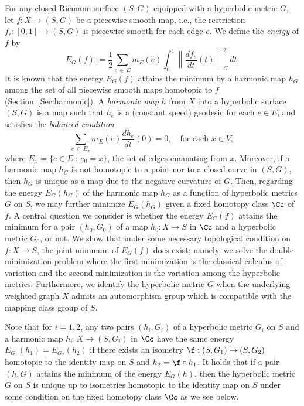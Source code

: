 For any closed Riemann surface $(S, G)$ equipped with a hyperbolic metric $G$, let $f:X \to (S, G)$ be a piecewise smooth map, i.e., the restriction $f_e:[0, 1] \to (S, G)$ is piecewise smooth for each edge $e$. We define the \emph{energy} of $f$ by
\begin{equation}\label{Eq:Dirichlet}
E_G(f):=\frac{1}{2}\sum_{e\,\in\,E}m_E(e)\int_0^1\left\|\frac{d f_e}{dt}(t)\right\|_G^2\,dt.
\end{equation}
It is known that the energy $E_G(f)$ attains the minimum by a harmonic map $h_G$ among the set of all piecewise smooth maps homotopic to $f$ (Section~\ref{Sec:harmonic}). A \emph{harmonic map} $h$ from $X$ into a hyperbolic surface $(S, G)$ is a map such that $h_e$ is a (constant speed) geodesic for each $e \in E$, and satisfies the \emph{balanced condition}
\[
\sum_{e\,\in\,E_x}m_E(e)\frac{d h_e}{dt}(0)=0, \quad \text{for each }x \in V,
\]
where $E_x=\{e \in E \ : \ e_0=x\}$, the set of edges emanating from $x$. Moreover, if a harmonic map $h_G$ is not homotopic to a point nor to a closed curve in $(S, G)$, then $h_G$ is unique as a map due to the negative curvature of $G$. Then, regarding the energy $E_G(h_G)$ of the harmonic map $h_G$ as a function of hyperbolic metrics $G$ on $S$, we may further minimize $E_G(h_G)$ given a fixed homotopy class $\Cc$ of $f$. A central question we consider is whether the energy $E_G(f)$ attains the minimum for a pair $(h_0, G_0)$ of a map $h_0: X \to S$ in $\Cc$ and a hyperbolic metric $G_0$, or not. We show that under some necessary topological condition on $f:X \to S$, the joint minimum of $E_G(f)$ does exist; namely, we solve the double minimization problem where the first minimization is the classical calculus of variation and the second minimization is the variation among the hyperbolic metrics. Furthermore, we identify the hyperbolic metric $G$ when the underlying weighted graph $X$ admits an automorphism group which is compatible with the mapping class group of $S$.

Note that for $i=1, 2$, any two pairs $(h_i, G_i)$ of a hyperbolic metric $G_i$ on $S$ and a harmonic map $h_i:X \to (S, G_i)$ in $\Cc$ have the same energy $E_{G_1}(h_{1})=E_{G_2}(h_{2})$ if there exists an isometry $\f: (S, G_1) \to (S, G_2)$ homotopic to the identity map on $S$ and $h_2=\f \circ h_1$. It holds that if a pair $(h, G)$ attains the minimum of the energy $E_G(h)$, then the hyperbolic metric $G$ on $S$ is unique up to isometries homotopic to the identity map on $S$ under some condition on the fixed homotopy class $\Cc$ as we see below.

